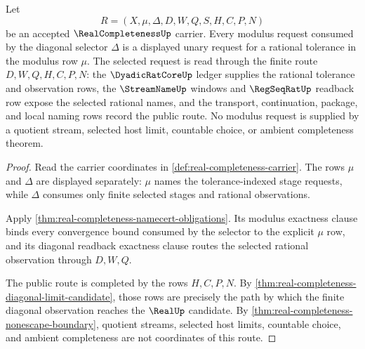 \begin{theorem}
\label{thm:real-completeness-modulus-domain-coverage}
Let
$$
R=(X,\mu,\Delta,D,W,Q,S,H,C,P,N)
$$
be an accepted $\RealCompletenessUp$ carrier. Every modulus request consumed by the diagonal selector $\Delta$ is a displayed unary request for a rational tolerance in the modulus row $\mu$. The selected request is read through the finite route $D,W,Q,H,C,P,N$: the $\DyadicRatCoreUp$ ledger supplies the rational tolerance and observation rows, the $\StreamNameUp$ windows and $\RegSeqRatUp$ readback row expose the selected rational names, and the transport, continuation, package, and local naming rows record the public route. No modulus request is supplied by a quotient stream, selected host limit, countable choice, or ambient completeness theorem.
\end{theorem}
\begin{proof}
Read the carrier coordinates in \autoref{def:real-completeness-carrier}. The rows $\mu$ and $\Delta$ are displayed separately: $\mu$ names the tolerance-indexed stage requests, while $\Delta$ consumes only finite selected stages and rational observations.

Apply \autoref{thm:real-completeness-namecert-obligations}. Its modulus exactness clause binds every convergence bound consumed by the selector to the explicit $\mu$ row, and its diagonal readback exactness clause routes the selected rational observation through $D,W,Q$.

The public route is completed by the rows $H,C,P,N$. By \autoref{thm:real-completeness-diagonal-limit-candidate}, those rows are precisely the path by which the finite diagonal observation reaches the $\RealUp$ candidate. By \autoref{thm:real-completeness-nonescape-boundary}, quotient streams, selected host limits, countable choice, and ambient completeness are not coordinates of this route.
\end{proof}

